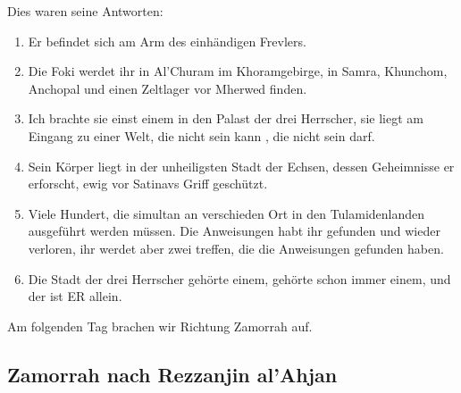 Dies waren seine Antworten:
\begin{enumerate}
    \item Er befindet sich am Arm des einhändigen Frevlers.
    \item Die Foki werdet ihr in Al'Churam im Khoramgebirge, in Samra, Khunchom, Anchopal und einen Zeltlager vor Mherwed finden.
    \item Ich brachte sie einst einem in den Palast der drei Herrscher, sie liegt am Eingang zu einer Welt, die nicht sein kann , die nicht sein darf.
    \item Sein Körper liegt in der unheiligsten Stadt der Echsen, dessen Geheimnisse er erforscht, ewig vor Satinavs Griff geschützt.
    \item Viele Hundert, die simultan an verschieden Ort in den Tulamidenlanden ausgeführt werden müssen. Die Anweisungen habt ihr gefunden und wieder verloren, ihr werdet aber zwei treffen, die die Anweisungen gefunden haben.
    \item Die Stadt der drei Herrscher gehörte einem, gehörte schon immer einem, und der ist ER allein.
\end{enumerate}


Am folgenden Tag brachen wir Richtung Zamorrah auf.

\subsection{Zamorrah nach Rezzanjin al'Ahjan}


